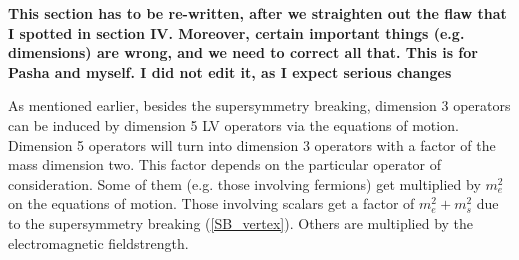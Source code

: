\documentclass[paper,12pt]{revtex4}
\begin{document}
{\bf This section has to be re-written, after we straighten out the 
flaw that I spotted in section IV. Moreover, certain important things (e.g. dimensions)
are wrong, and we need to correct all that. This is for Pasha and myself.
I did not edit it, as I expect serious changes}

	As mentioned earlier, besides the supersymmetry breaking, 
	dimension 3 operators can be induced by dimension 5 LV 
	operators via the equations of motion.
	Dimension 5 operators will turn into dimension 3 operators 
	with a factor of the mass dimension two.
	This factor depends on the particular operator of consideration.
	Some of them (e.g. those involving fermions) 
	get multiplied by $ m_e^2 $ on the equations of motion.
	Those involving scalars get a factor of
	$ m_e^2 + m_s^2 $
	due to the supersymmetry breaking (\ref{SB_vertex}).
	Others are multiplied by the electromagnetic fieldstrength.
	
	
\end{document}
